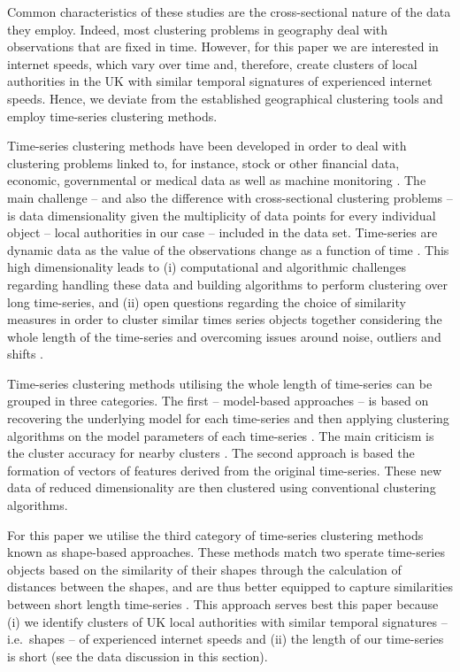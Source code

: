 \documentclass[]{interact}
\theoremstyle{plain}%
\theoremstyle{definition}
\theoremstyle{remark}
\begin{document}
Common characteristics of these studies are the cross-sectional nature
of the data they employ. Indeed, most clustering problems in geography
deal with observations that are fixed in time. However, for this paper
we are interested in internet speeds, which vary over time and,
therefore, create clusters of local authorities in the UK with similar
temporal signatures of experienced internet speeds. Hence, we deviate
from the established geographical clustering tools and employ
time-series clustering methods.

Time-series clustering methods have been developed in order to deal with
clustering problems linked to, for instance, stock or other financial
data, economic, governmental or medical data as well as machine
monitoring
\citep{aggarwal2013time, aggarwal2001surprising, hyndman2015large, WARRENLIAO20051857}.
The main challenge -- and also the difference with cross-sectional
clustering problems -- is data dimensionality given the multiplicity of
data points for every individual object -- local authorities in our case
-- included in the data set. Time-series are dynamic data as the value
of the observations change as a function of time
\citep{aghabozorgi2015time}. This high dimensionality leads to (i)
computational and algorithmic challenges regarding handling these data
and building algorithms to perform clustering over long time-series, and
(ii) open questions regarding the choice of similarity measures in order
to cluster similar times series objects together considering the whole
length of the time-series and overcoming issues around noise, outliers
and shifts \citep{lin2004iterative, aghabozorgi2015time}.

Time-series clustering methods utilising the whole length of time-series
can be grouped in three categories. The first -- model-based approaches
-- is based on recovering the underlying model for each time-series and
then applying clustering algorithms on the model parameters of each
time-series \citep{aghabozorgi2015time}. The main criticism is the
cluster accuracy for nearby clusters \citep{mitsa2010temporal}. The
second approach is based the formation of vectors of features derived
from the original time-series. These new data of reduced dimensionality
are then clustered using conventional clustering algorithms.

For this paper we utilise the third category of time-series clustering
methods known as shape-based approaches. These methods match two sperate
time-series objects based on the similarity of their shapes through the
calculation of distances between the shapes, and are thus better
equipped to capture similarities between short length time-series
\citep{aghabozorgi2015time}. This approach serves best this paper
because (i) we identify clusters of UK local authorities with similar
temporal signatures -- i.e.~shapes -- of experienced internet speeds and
(ii) the length of our time-series is short (see the data discussion in
this section).
\end{document}
